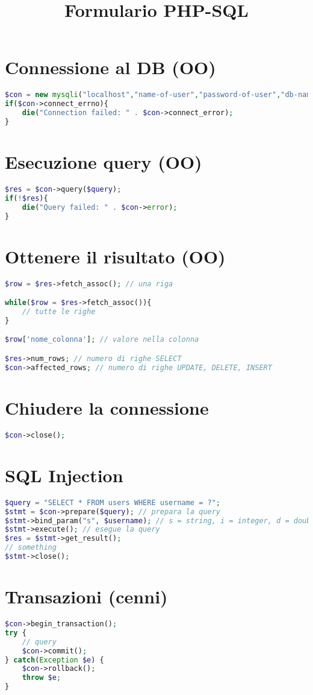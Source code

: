 \documentclass[12pt, a4paper]{article}
\title{Formulario PHP-SQL}
\date{}
\author{}
\begin{document}
\maketitle
\section{Connessione al DB (OO)}
\begin{lstlisting}[language=PHP]
$con = new mysqli("localhost","name-of-user","password-of-user","db-name");
if($con->connect_errno){
    die("Connection failed: " . $con->connect_error);
}
\end{lstlisting}
\section{Esecuzione query (OO)}
\begin{lstlisting}[language=PHP]
$res = $con->query($query);
if(!$res){
    die("Query failed: " . $con->error);
}
\end{lstlisting}
\section{Ottenere il risultato (OO)}
\begin{lstlisting}[language=PHP]
$row = $res->fetch_assoc(); // una riga

while($row = $res->fetch_assoc()){
    // tutte le righe
}

$row['nome_colonna']; // valore nella colonna

$res->num_rows; // numero di righe SELECT
$con->affected_rows; // numero di righe UPDATE, DELETE, INSERT
\end{lstlisting}
\section{Chiudere la connessione}
\begin{lstlisting}[language=PHP]
$con->close();
\end{lstlisting}
\section{SQL Injection}
\begin{lstlisting}[language=PHP]
$query = "SELECT * FROM users WHERE username = ?";
$stmt = $con->prepare($query); // prepara la query
$stmt->bind_param("s", $username); // s = string, i = integer, d = double, b = blob
$stmt->execute(); // esegue la query
$res = $stmt->get_result();
// something
$stmt->close();
\end{lstlisting}
\section{Transazioni (cenni)}
\begin{lstlisting}[language=PHP]
$con->begin_transaction();
try {
    // query
    $con->commit();
} catch(Exception $e) {
    $con->rollback();
    throw $e;
}
\end{lstlisting}
\end{document}
